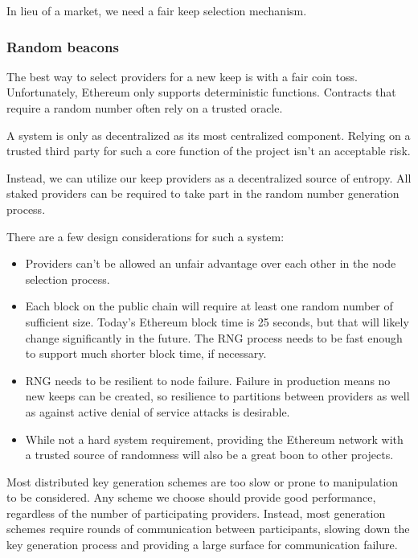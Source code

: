 \documentclass[11pt]{article}
\begin{document}
In lieu of a market, we need a fair keep selection mechanism.

\subsubsection{Random beacons}

The best way to select providers for a new keep is with a fair coin
toss. Unfortunately, Ethereum only supports deterministic functions.
Contracts that require a random number often rely on a trusted oracle.

A system is only as decentralized as its most centralized component.
Relying on a trusted third party for such a core function of the
project isn't an acceptable risk.

Instead, we can utilize our keep providers as a decentralized source
of entropy. All staked providers can be required to take part in the
random number generation process.

There are a few design considerations for such a system:
\begin{itemize}
  \item Providers can't be allowed an unfair advantage over each other
      in the node selection process.
  \item Each block on the public chain will require at least one
      random number of sufficient size. Today's Ethereum block time is
      25 seconds, but that will likely change significantly in the
      future. The RNG process needs to be fast enough to support much
      shorter block time, if necessary.
  \item RNG needs to be resilient to node failure. Failure in
      production means no new keeps can be created, so resilience
      to partitions between providers as well as against active denial
      of service attacks is desirable.
  \item While not a hard system requirement, providing the Ethereum
      network with a trusted source of randomness will also be a great
      boon to other projects.
\end{itemize}

Most distributed key generation schemes are too slow or prone to
manipulation to be considered. Any scheme we choose should provide
good performance, regardless of the number of participating providers.
Instead, most generation schemes require rounds of communication
between participants, slowing down the key generation process and
providing a large surface for communication failure.
\end{document}
